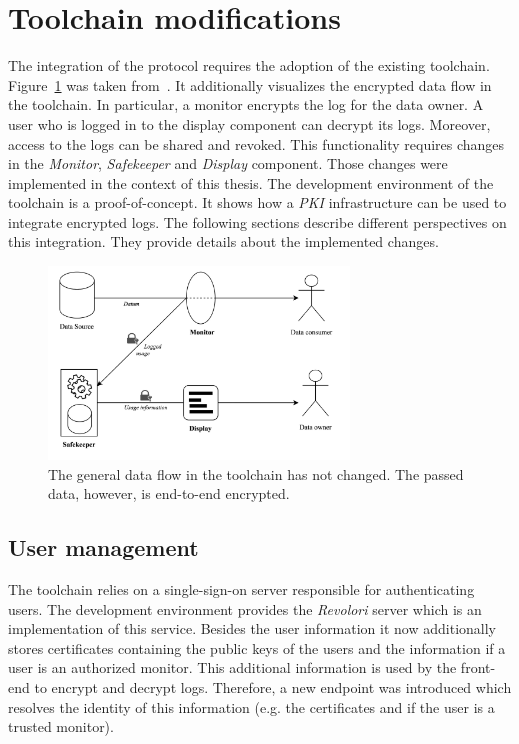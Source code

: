 \documentclass[../main.tex]{subfiles}
\begin{document}
\section{Toolchain modifications}
\label{sec:toolchain-modifications}
The integration of the protocol requires the adoption of the existing toolchain.
Figure~\ref{fig:encrypted-toolchain} was taken from~\cite{Zieglmeier2021}.
It additionally visualizes the encrypted data flow in the toolchain.
In particular, a monitor encrypts the log for the data owner.
A user who is logged in to the display component can decrypt its logs.
Moreover, access to the logs can be shared and revoked.
This functionality requires changes in the \emph{Monitor}, \emph{Safekeeper} and \emph{Display} component.
Those changes were implemented in the context of this thesis.
The development environment of the toolchain is a proof-of-concept.
It shows how a \emph{PKI} infrastructure can be used to integrate encrypted logs.
The following sections describe different perspectives on this integration.
They provide details about the implemented changes.


\begin{figure}[h!]
    \includegraphics[width=8cm]{../img/06/encrypted_toolchain.jpg}
    \centering
    \caption[Toolchain encrypted data flow]{The general data flow in the toolchain has not changed. The passed data, however, is end-to-end encrypted.}
    \label{fig:encrypted-toolchain}
\end{figure}

\subsection{User management}
The toolchain relies on a single-sign-on server responsible for authenticating users.
The development environment provides the \emph{Revolori} server which is an implementation of this service.
Besides the user information it now additionally stores certificates containing the public keys of the users and the information if a user is an authorized monitor.
This additional information is used by the front-end to encrypt and decrypt logs.
Therefore, a new endpoint was introduced which resolves the identity of this information (e.g. the certificates and if the user is a trusted monitor).
\end{document}
